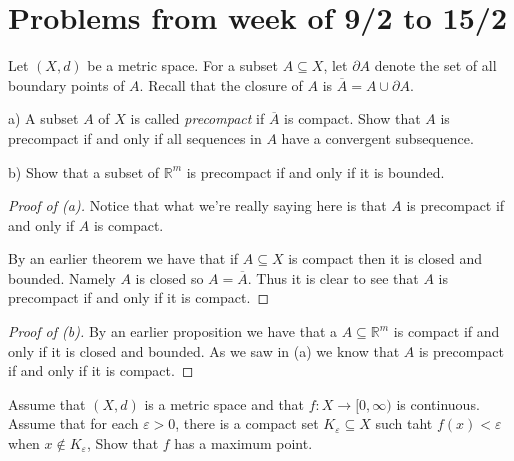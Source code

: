 \section{Problems from week of 9/2 to 15/2}
\begin{prob}
    Let $(X,d)$ be a metric space. For a subset $A \subseteq X$, 
    let $\partial A$ denote the set of all boundary points of $A$. 
    Recall that the closure of $A$ is $\overline A = A 
    \cup \partial A$. 

    \medskip

    a) A subset $A$ of $X$ is called \emph{precompact} if 
    $\overline A$ is compact. Show that $A$ is precompact if 
    and only if all sequences in $A$ have a convergent subsequence. 

    \medskip 

    b) Show that a subset of $\mathbb R^m$ is precompact if 
    and only if it is bounded. 
\end{prob}
\begin{proof}[Proof of (a)]
    Notice that what we're really saying here is that 
    $A$ is precompact if and only if $A$ is compact. 

    By an earlier theorem we have that if $A \subseteq X$ is 
    compact then it is closed and bounded. Namely 
    $A$ is closed so $A = \overline A$. Thus it is clear to 
    see that $A$ is precompact if and only if it is compact. 
\end{proof}
\begin{proof}[Proof of (b)]
    By an earlier proposition we have that a $A \subseteq \mathbb R^m$
    is compact if and only if it is closed and bounded. As we 
    saw in (a) we know that $A$ is precompact if and only 
    if it is compact. 
\end{proof}
\begin{prob}
    Assume that $(X,d)$ is a metric space and that 
    $f : X \to [0,\infty)$ is continuous. Assume that for each 
    $\varepsilon > 0$, there is a compact set $K_\varepsilon 
    \subseteq X$ such taht $f(x) < \varepsilon$ when 
    $x \not\in K_\varepsilon$, Show that $f$ has a maximum point.
\end{prob}
